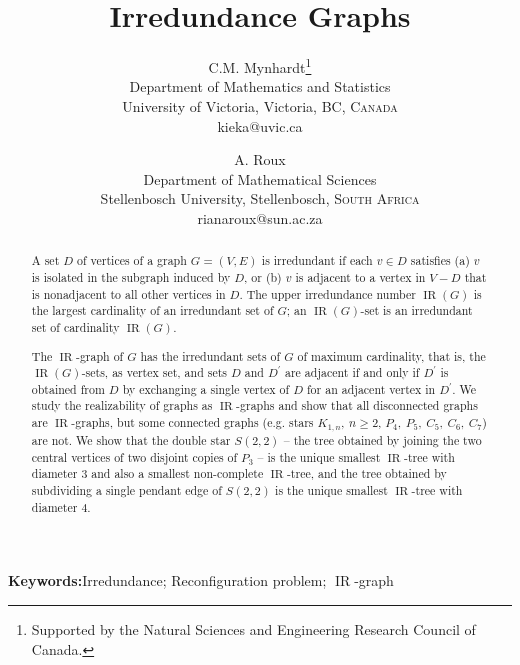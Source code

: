 \documentclass[12pt]{article}%
\begin{document}
\title{\textbf{Irredundance Graphs}}
\author{C.M. Mynhardt\thanks{Supported by the Natural Sciences and Engineering
Research Council of Canada.}\\Department of Mathematics and Statistics\\University of Victoria, Victoria, BC, \textsc{Canada}\\{\small kieka@uvic.ca}
\and A. Roux\\Department of Mathematical Sciences\\Stellenbosch University, Stellenbosch, \textsc{South Africa}\\{\small rianaroux@sun.ac.za}}
\maketitle

\begin{abstract}
A set $D$ of vertices of a graph $G=(V,E)$ is irredundant if each $v\in D$
satisfies (a) $v$ is isolated in the subgraph induced by $D$, or (b) $v$ is
adjacent to a vertex in $V-D$ that is nonadjacent to all other vertices in
$D$. The upper irredundance number $\operatorname{IR}(G)$ is the largest
cardinality of an irredundant set of $G$; an $\operatorname{IR}(G)$-set is an
irredundant set of cardinality $\operatorname{IR}(G)$.

The $\operatorname{IR}$-graph of $G$ has the irredundant sets of $G$ of
maximum cardinality, that is, the $\operatorname{IR}(G)$-sets, as vertex set,
and sets $D$ and $D^{\prime}$ are adjacent if and only if $D^{\prime}$ is
obtained from $D$ by exchanging a single vertex of $D$ for an adjacent vertex
in $D^{\prime}$. We study the realizability of graphs as $\operatorname{IR}%
$-graphs and show that all disconnected graphs are $\operatorname{IR}$-graphs,
but some connected graphs (e.g. stars $K_{1,n},\ n\geq2$, $P_{4}%
,\ P_{5},\ C_{5},\ C_{6},\ C_{7}$) are not. We show that the double star
$S(2,2)$ -- the tree obtained by joining the two central vertices of two
disjoint copies of $P_{3}$ -- is the unique smallest $\operatorname{IR}$-tree
with diameter $3$ and also a smallest non-complete $\operatorname{IR}$-tree,
and the tree obtained by subdividing a single pendant edge of $S(2,2)$ is the
unique smallest $\operatorname{IR}$-tree with diameter $4$.

\end{abstract}

\noindent\textbf{Keywords:\hspace{0.1in}}Irredundance; Reconfiguration
problem; $\operatorname{IR}$-graph
\end{document}
